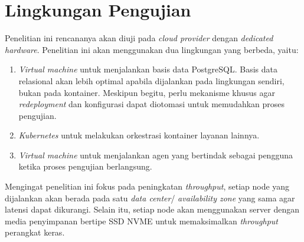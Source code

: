 \section{Lingkungan Pengujian}

Penelitian ini rencananya akan diuji pada \textit{cloud provider} dengan \textit{dedicated hardware}. Penelitian ini akan menggunakan dua lingkungan yang berbeda, yaitu:

\begin{enumerate}
    \item \textit{Virtual machine} untuk menjalankan basis data PostgreSQL. Basis data relasional akan lebih optimal apabila dijalankan pada lingkungan sendiri, bukan pada kontainer. Meskipun begitu, perlu mekanisme khusus agar \textit{redeployment} dan konfigurasi dapat diotomasi untuk memudahkan proses pengujian.
    \item \textit{Kubernetes} untuk melakukan orkestrasi kontainer layanan lainnya.
    \item \textit{Virtual machine} untuk menjalankan agen yang bertindak sebagai pengguna ketika proses pengujian berlangsung.
\end{enumerate}

Mengingat penelitian ini fokus pada peningkatan \textit{throughput}, setiap node yang dijalankan akan berada pada satu \textit{data center}/ \textit{availability zone} yang sama agar latensi dapat dikurangi. Selain itu, setiap node akan menggunakan server dengan media penyimpanan bertipe SSD NVME untuk memaksimalkan \textit{throughput} perangkat keras.